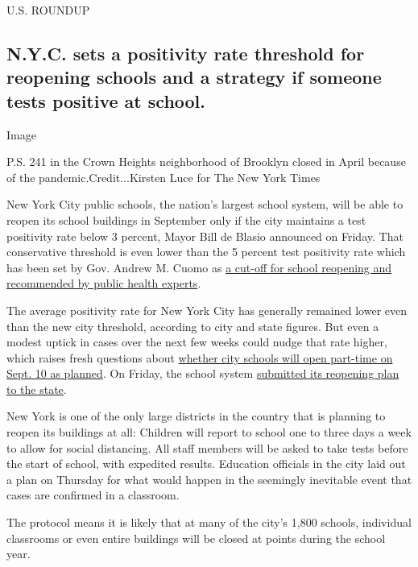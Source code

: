 U.S. ROUNDUP

\hypertarget{nyc-sets-a-positivity-rate-threshold-for-reopening-schools-and-a-strategy-if-someone-tests-positive-at-school}{%
\subsection{N.Y.C. sets a positivity rate threshold for reopening
schools and a strategy if someone tests positive at
school.}\label{nyc-sets-a-positivity-rate-threshold-for-reopening-schools-and-a-strategy-if-someone-tests-positive-at-school}}

Image

P.S. 241 in the Crown Heights neighborhood of Brooklyn closed in April
because of the pandemic.Credit...Kirsten Luce for The New York Times

New York City public schools, the nation's largest school system, will
be able to reopen its school buildings in September only if the city
maintains a test positivity rate below 3 percent, Mayor Bill de Blasio
announced on Friday. That conservative threshold is even lower than the
5 percent test positivity rate which has been set by Gov. Andrew M.
Cuomo as
\href{https://www.nytimes3xbfgragh.onion/2020/07/14/us/coronavirus-schools-fall.html}{a
cut-off for school reopening and recommended by public health experts}.

The average positivity rate for New York City has generally remained
lower even than the new city threshold, according to city and state
figures. But even a modest uptick in cases over the next few weeks could
nudge that rate higher, which raises fresh questions about
\href{https://www.nytimes3xbfgragh.onion/2020/07/08/nyregion/nyc-schools-reopening-plan.html}{whether
city schools will open part-time on Sept. 10 as planned}. On Friday, the
school system
\href{https://infohub.nyced.org/docs/default-source/default-document-library/nyc-doe---state-doh-reopening-plan-7-31.pdf}{submitted
its reopening plan to the state}.

New York is one of the only large districts in the country that is
planning to reopen its buildings at all: Children will report to school
one to three days a week to allow for social distancing. All staff
members will be asked to take tests before the start of school, with
expedited results. Education officials in the city laid out a plan on
Thursday for what would happen in the seemingly inevitable event that
cases are confirmed in a classroom.

The protocol means it is likely that at many of the city's 1,800
schools, individual classrooms or even entire buildings will be closed
at points during the school year.

